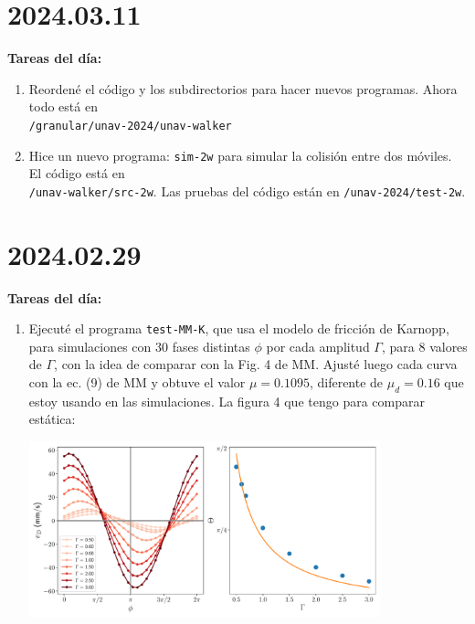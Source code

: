 \documentclass[11pt]{article}
\begin{document}
\section*{2024.03.11}
\textbf{Tareas del día:}
\begin{enumerate}
    \item Reordené el código y los subdirectorios para hacer nuevos programas. Ahora todo está en \\
        \texttt{/granular/unav-2024/unav-walker}
\item Hice un nuevo programa: \texttt{sim-2w} para simular la colisión entre dos móviles. El código está en \\
    \texttt{/unav-walker/src-2w}. Las pruebas del código están en \texttt{/unav-2024/test-2w}.
\end{enumerate}

\section*{2024.02.29}
\textbf{Tareas del día:}
\begin{enumerate}
    \item Ejecuté el programa \texttt{test-MM-K}, que usa el modelo de fricción de Karnopp, para simulaciones con 30 fases distintas $\phi$ por cada amplitud $\Gamma$, para 8 valores de $\Gamma$, con la idea de comparar con la Fig. 4 de MM. Ajusté luego cada curva con la ec. (9) de MM y obtuve el valor $\mu = 0.1095$, diferente de $\mu_d = 0.16$ que estoy usando en las simulaciones. La figura 4 que tengo para comparar estática:
        \begin{center}
            \includegraphics[width=0.8\textwidth]{figs/Fig_4_MM.pdf}
        \end{center}
\end{enumerate}
\end{document}
